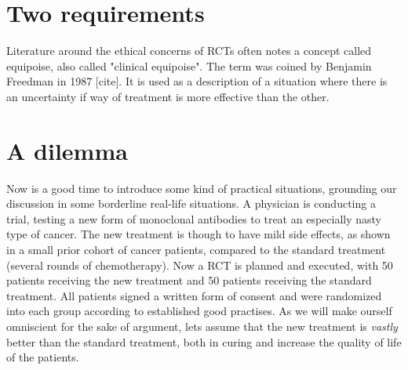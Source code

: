 \documentclass[12p]{article}
\begin{document}
\section*{Two requirements}

Literature around the ethical concerns of RCTs often notes a concept called equipoise, also called "clinical equipoise".
The term was coined by Benjamin Freedman in 1987 [cite].
It is used as a description of a situation where there is an uncertainty if way of treatment is more effective than the other.


\section*{A dilemma}

Now is a good time to introduce some kind of practical situations, grounding our discussion in some borderline real-life situations.
A physician is conducting a trial, testing a new form of monoclonal antibodies to treat an especially nasty type of cancer.
The new treatment is though to have mild side effects, as shown in a small prior cohort of cancer patients, compared to the standard treatment (several rounds of chemotherapy).
Now a RCT is planned and executed, with 50 patients receiving the new treatment and 50 patients receiving the standard treatment.
All patients signed a written form of consent and were randomized into each group according to established good practises.
As we will make ourself omniscient for the sake of argument, lets assume that the new treatment is \emph{vastly} better than the standard treatment, both in curing and increase the quality of life of the patients.

\end{document}
